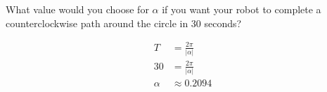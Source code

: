 What value would you choose for $\alpha$ if you want your robot to complete a counterclockwise path around the circle in 30 seconds?

\begin{solution}
\begin{align*}
    T &= \frac{2\pi}{|\alpha|} \\
    30 &= \frac{2\pi}{|\alpha|} \\
    \alpha &\approx 0.2094
\end{align*}
\end{solution}
